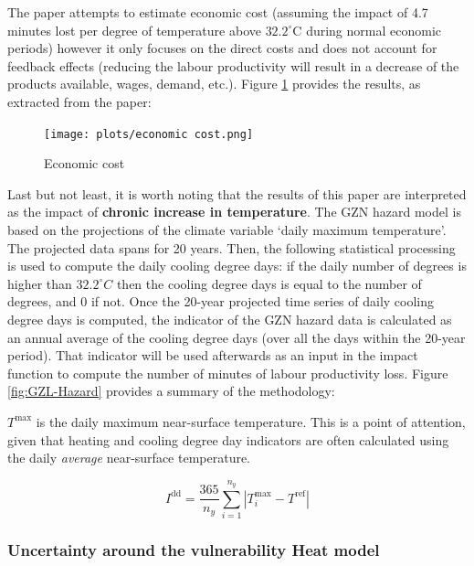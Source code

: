 \documentclass[a4paper,11pt]{extarticle} %
\theoremstyle{definition}
\begin{document}
The paper attempts to estimate economic cost (assuming the impact of 4.7 minutes lost per degree of temperature above $32.2^\circ $C during normal economic periods) however it only focuses on the direct costs and does not account for feedback effects (reducing the labour productivity will result in a decrease of the products available, wages, demand, etc.). Figure \ref{fig:economiccost} provides the results, as extracted from the paper:
\begin{figure}[h]
    \centering
    \texttt{[image: plots/economic cost.png]}
    \caption{Economic cost}
    \label{fig:economiccost}
\end{figure}

Last but not least, it is worth noting that the results of this paper are interpreted as the impact of \textbf{chronic increase in temperature}.
The GZN hazard  model is based on the projections of the climate variable `daily maximum temperature'. The projected data spans for 20 years. Then, the following statistical processing is used to compute the daily cooling degree days: if the daily number of degrees is higher than $32.2^\circ C$ then the cooling degree days is equal to the number of degrees, and 0 if not. Once the 20-year projected time series of daily cooling degree days is computed, the indicator of the GZN hazard data is calculated as an annual average of the cooling degree days (over all the days within the 20-year period). That indicator will be used afterwards as an input in the impact function to compute the number of minutes of labour productivity loss. Figure \ref{fig:GZL-Hazard} provides a summary of the methodology:

$T^\text{max}$ is the daily maximum near-surface temperature. This is a point of attention, given that heating and cooling degree day indicators are often calculated using the daily \emph{average} near-surface temperature.

\begin{equation}
    \label{Eq:degree_days}
    I^\text{dd} = \frac{365}{n_y} \sum_{i = 1}^{n_y} |  T^\text{max}_i - T^\text{ref} |
\end{equation}



\subsubsection{Uncertainty around the vulnerability Heat model}
\end{document}
